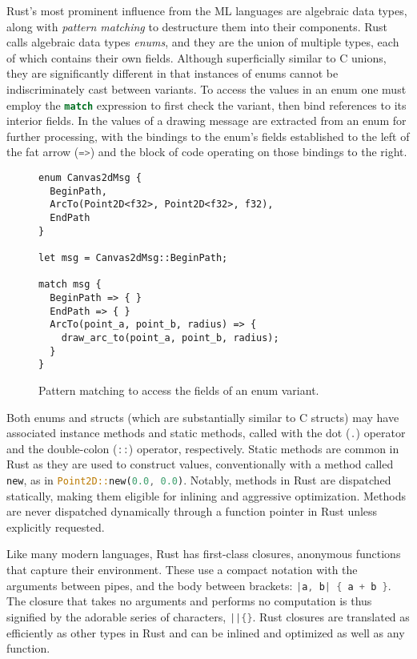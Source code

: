 Rust's most prominent influence from the ML languages are algebraic data types,
along with \emph{pattern matching} to destructure
them into their components. Rust calls algebraic data types \emph{enums},
and they are the union of multiple types,
each of which contains their own fields. Although superficially
similar to C unions, they are significantly different in that
instances of enums cannot be indiscriminately cast between
variants.
To access the values in an enum one must employ the \lstinline[language=Rust]{match}
expression to first check the variant, then bind references
to its interior fields. In  the values of
a drawing message are extracted from an enum for further processing,
with the bindings to the enum's fields established to the left of the
fat arrow (\lstinline[language=Rust]{=>}) and the block of code operating
on those bindings to the right.

\begin{figure}
\begin{lstlisting}
enum Canvas2dMsg {
  BeginPath,
  ArcTo(Point2D<f32>, Point2D<f32>, f32),
  EndPath
}

let msg = Canvas2dMsg::BeginPath;

match msg {
  BeginPath => { }
  EndPath => { }
  ArcTo(point_a, point_b, radius) => {
    draw_arc_to(point_a, point_b, radius);
  }
}
\end{lstlisting}
  \caption{Pattern matching to access the fields of an enum variant.}
  \label{fig:enums}
\end{figure}

Both enums and structs (which are substantially similar to C structs)
may have associated instance methods and static methods, called with the dot
(\lstinline[language=Rust]{.}) operator and the double-colon
(\lstinline[language=Rust]{::}) operator, respectively.
Static methods are common in Rust as they are used to construct
values, conventionally with a method called
\lstinline[language=Rust]{new}, as in
\lstinline[language=Rust]{Point2D::new(0.0, 0.0)}.
Notably, methods in Rust are dispatched statically, making them
eligible for inlining and aggressive optimization.
Methods are never dispatched dynamically through a function pointer in Rust
unless explicitly requested.

Like many modern languages, Rust has first-class closures,
anonymous functions that capture their environment. These
use a compact notation with the arguments between pipes,
and the body between brackets: \lstinline[language=Rust]~|a, b| { a + b }~.
The closure that takes no arguments and performs no computation is
thus signified by the adorable series of characters, \lstinline[language=Rust]~||{}~.
Rust closures are translated as efficiently as other types
in Rust and can be inlined and optimized as well as any function.

